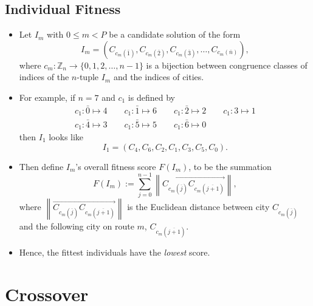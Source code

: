 \documentclass[xcolor={usenames,dvipsnames,svgnames}]{beamer}
\begin{document}
\subsection{Individual Fitness}
\begin{frame}
\begin{itemize}
	\item<1-> Let $I_m$ with $0 \leqslant m < P$ be a candidate solution of the form 
	\begin{equation*}
	I_m = \left(C_{c_m(\bar 1)}, C_{c_m(\bar 2)}, C_{c_m(\bar 3)}, \ldots, C_{c_m(\bar n)}\right),
	\end{equation*}
	where $c_m\colon \mathbb Z_n \to \{0, 1, 2, \ldots, n-1\}$ is a bijection between congruence classes of indices of the $n$-tuple $I_m$ and the indices of cities. 
	\item<2-> For example, if $n = 7$ and $c_1$ is defined by 
	\begin{gather*}
	c_1\colon \bar 0 \mapsto 4 \qquad c_1\colon \bar 1 \mapsto 6 \qquad c_1\colon \bar 2 \mapsto 2 \qquad c_1\colon 3 \mapsto 1 \\
	c_1\colon \bar 4 \mapsto 3 \qquad c_1\colon \bar 5 \mapsto 5 \qquad c_1\colon \bar 6 \mapsto 0
	\end{gather*}
	then $I_1$ looks like
	\begin{equation*}
	I_1 = \left( C_4, C_6, C_2, C_1, C_3, C_5, C_0 \right).
	\end{equation*}
\end{itemize}
\end{frame}

\begin{frame}
\begin{itemize}
	\item<1-> Then define $I_m$'s overall fitness score $F(I_m)$, to be the summation
	\begin{equation*}
	F(I_m) := \sum_{j = 0}^{n-1} \left\lVert\overrightarrow{C_{c_m(\overline{j})} C_{c_m(\overline{j+1})}}\right\rVert,
	\end{equation*}
	where $\left\lVert\overrightarrow{C_{c_m(\overline{j})} C_{c_m(\overline{j+1})}}\right\rVert$ is the Euclidean distance between city $C_{c_m(\overline{j})}$ and the following city on route $m$, $C_{c_m(\overline{j+1})}$. 
	\item<2-> Hence, the fittest individuals have the {\em lowest} score.
\end{itemize}
\end{frame}

\section{Crossover}
\end{document}
